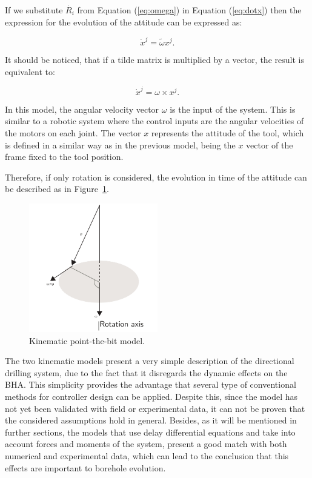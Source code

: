  If we substitute $\dot{R_i}$ from Equation (\ref{eq:omega}) in Equation (\ref{eq:dotx}) then the expression for the evolution of the attitude can be expressed as:
 
 \begin{equation}
 	\dot{x}^j = \tilde{\omega}x^j.
 \end{equation}
 
 It should be noticed, that if a tilde matrix is multiplied by a vector, the result is equivalent to:
 
  \begin{equation*}
  \dot{x}^j = \omega \times x^j.
  \end{equation*}
  
  In this model, the angular velocity vector $\omega$ is the input of the system. This is similar to a robotic system where the control inputs are the angular velocities of the motors on each joint. The vector $x$ represents the attitude of the tool, which is defined in a similar way as in the previous model, being the $x$ vector of the frame fixed to the tool position.
 
Therefore, if only rotation is considered, the evolution in time of the attitude can be described as in Figure~\ref{fig:pointkmodel}.

\begin{figure}[ht]\centering
	\includegraphics[width=0.5\textwidth]{img/rotationkin.pdf}
	\caption{\label{fig:pointkmodel}Kinematic point-the-bit model.}
\end{figure}

The two kinematic models present a very simple description of the directional drilling system, due to the fact that it disregards the dynamic effects on the BHA. This simplicity provides the advantage that several type of conventional methods for controller design can be applied. Despite this, since the model has not yet been validated with field or experimental data, it can not be proven that the considered assumptions hold in general. Besides, as it will be mentioned in further sections, the models that use delay differential equations and take into account forces and moments of the system, present a good match with both numerical and experimental data, which can lead to the conclusion that this effects are important to borehole evolution.

